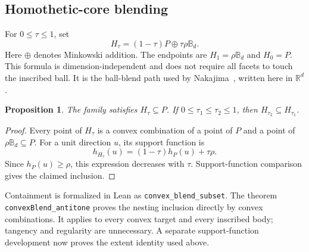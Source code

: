 \documentclass[11pt,a4paper]{article}
\newcommand{\R}{\mathbb R}
\newcommand{\B}{\mathbb B}
\newcommand{\code}[1]{\texttt{\nolinkurl{#1}}}
\newtheorem{proposition}{Proposition}
\begin{document}
\subsection{Homothetic-core blending}
For $0\leq\tau\leq1$, set
\begin{equation}\label{eq:blend}
H_\tau=(1-\tau)P\oplus\tau\rho\B_d.
\end{equation}
Here $\oplus$ denotes Minkowski addition. The endpoints are $H_1=\rho\B_d$ and $H_0=P$. This formula is dimension-independent and does not require all facets to touch the inscribed ball. It is the ball-blend path used by Nakajima~\cite[Section 3]{nakajima2026}, written here in $\R^d$.

\begin{proposition}\label{prop:blend}
The family satisfies $H_\tau\subseteq P$. If $0\leq\tau_1\leq\tau_2\leq1$, then $H_{\tau_2}\subseteq H_{\tau_1}$.
\end{proposition}
\begin{proof}
Every point of $H_\tau$ is a convex combination of a point of $P$ and a point of $\rho\B_d\subseteq P$. For a unit direction $u$, its support function is
\[
h_{H_\tau}(u)=(1-\tau)h_P(u)+\tau\rho.
\]
Since $h_P(u)\geq\rho$, this expression decreases with $\tau$. Support-function comparison gives the claimed inclusion.
\end{proof}

Containment is formalized in Lean as \code{convex_blend_subset}. The theorem \code{convexBlend_antitone} proves the nesting inclusion directly by convex combinations. It applies to every convex target and every inscribed body; tangency and regularity are unnecessary. A separate support-function development now proves the extent identity used above.
\end{document}
